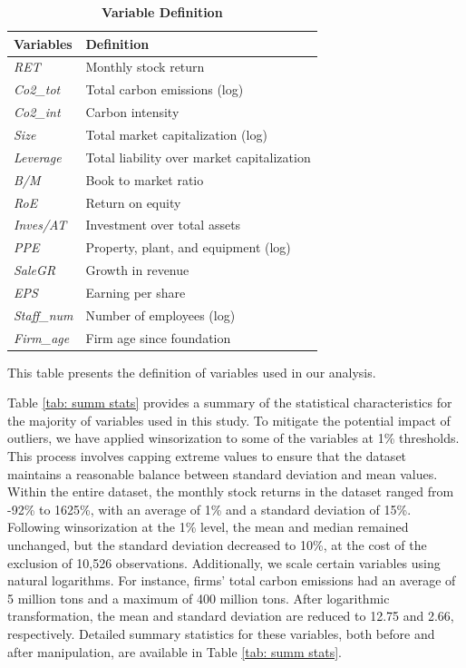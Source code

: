 \documentclass[12pt]{article}
\begin{document}
\begin{table}[!ht]
\footnotesize
\centering
\caption{\textbf{Variable Definition}}
\label{tab: var def}
\begin{tabular}{ll}
\toprule
Variables & Definition \\ \hline

\textit{RET} & Monthly stock return \\
\textit{Co2\_tot} & Total carbon emissions (log) \\
\textit{Co2\_int} & Carbon intensity \\
\textit{Size} & Total market capitalization (log) \\
\textit{Leverage} & Total liability over market capitalization \\
\textit{B/M} & Book to market ratio \\
\textit{RoE} & Return on equity \\
\textit{Inves/AT} & Investment over total assets \\
\textit{PPE} & Property, plant, and equipment (log) \\
\textit{SaleGR} & Growth in revenue \\
\textit{EPS} & Earning per share \\
\textit{Staff\_num} & Number of employees (log) \\
\textit{Firm\_age} & Firm age since foundation\\
  
\bottomrule
\end{tabular}
\begin{tablenotes}
\footnotesize
\item This table presents the definition of variables used in our analysis.
\end{tablenotes}
\end{table}

Table \ref{tab: summ stats} provides a summary of the statistical characteristics for the majority of variables used in this study. To mitigate the potential impact of outliers, we have applied winsorization to some of the variables at 1\% thresholds. This process involves capping extreme values to ensure that the dataset maintains a reasonable balance between standard deviation and mean values. Within the entire dataset, the monthly stock returns in the dataset ranged from -92\% to 1625\%, with an average of 1\% and a standard deviation of 15\%. Following winsorization at the 1\% level, the mean and median remained unchanged, but the standard deviation decreased to 10\%, at the cost of the exclusion of 10,526 observations. Additionally, we scale certain variables using natural logarithms. For instance, firms' total carbon emissions had an average of 5 million tons and a maximum of 400 million tons. After logarithmic transformation, the mean and standard deviation are reduced to 12.75 and 2.66, respectively. Detailed summary statistics for these variables, both before and after manipulation, are available in Table \ref{tab: summ stats}.
\end{document}
